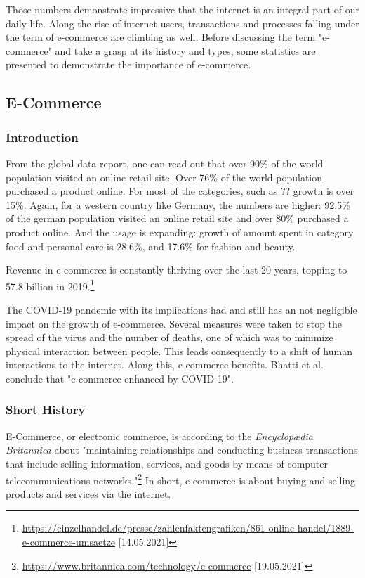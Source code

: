 Those numbers demonstrate impressive that the internet is an integral part of our daily life.
Along the rise of internet users, transactions and processes falling under the term of e-commerce are climbing as well.
Before discussing the term "e-commerce" and take a grasp at its history and types, some statistics are presented to demonstrate the importance of e-commerce.


\subsection{E-Commerce}

\subsubsection{Introduction}

From the global data report, one can read out that over 90\% of the world population visited an online retail site.
Over 76\% of the world population purchased a product online.
For most of the categories, such as ?? growth is over 15\%.  %
Again, for a western country like Germany, the numbers are higher:
92.5\% of the german population visited an online retail site and over 80\% purchased a product online.
And the usage is expanding: growth of amount spent in category food and personal care is 28.6\%, and 17.6\% for fashion and beauty.

Revenue in e-commerce is constantly thriving over the last 20 years, topping to 57.8 billion in 2019.\footnote{\url{https://einzelhandel.de/presse/zahlenfaktengrafiken/861-online-handel/1889-e-commerce-umsaetze} [14.05.2021]}


The COVID-19 pandemic with its implications had and still has an not negligible impact on the growth of e-commerce.
Several measures were taken to stop the spread of the virus and the number of deaths, one of which was to minimize physical interaction between people.
This leads consequently to a shift of human interactions to the internet.
Along this, e-commerce benefits.
Bhatti et al. \cite{2020Bhatti} conclude that "e-commerce enhanced by COVID-19".

\subsubsection{Short History}

E-Commerce, or electronic commerce, is according to the \textit{Encyclopædia Britannica} about "maintaining relationships and conducting business transactions that include selling information, services, and goods by means of computer telecommunications networks."\footnote{\url{https://www.britannica.com/technology/e-commerce} [19.05.2021]}
In short, e-commerce is about buying and selling products and services via the internet.

